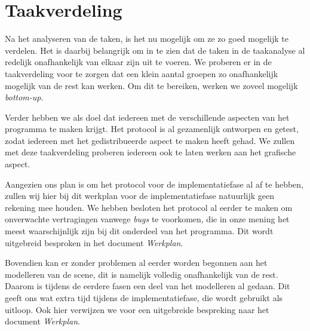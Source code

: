 \documentclass[a4paper,11pt]{article}
\begin{document}
    \section{Taakverdeling}
    Na het analyseren van de taken, is het nu mogelijk om ze zo goed mogelijk te verdelen. Het is daarbij belangrijk om in te zien dat de taken in de taakanalyse al redelijk onafhankelijk van elkaar zijn uit te voeren. We proberen er in de taakverdeling voor te zorgen dat een klein aantal groepen zo onafhankelijk mogelijk van de rest kan werken. Om dit te bereiken, werken we zoveel mogelijk \emph{bottom-up}. 
    
    Verder hebben we als doel dat iedereen met de verschillende aspecten van het programma te maken krijgt. Het protocol is al gezamenlijk ontworpen en getest, zodat iedereen met het gedistribueerde aspect te maken heeft gehad. We zullen met deze taakverdeling proberen iedereen ook te laten werken aan het grafische aspect.
    
    Aangezien ons plan is om het protocol voor de implementatiefase al af te hebben, zullen wij hier bij dit werkplan voor de implementatiefase natuurlijk geen rekening mee houden. We hebben besloten het protocol al eerder te maken om onverwachte vertragingen vanwege \emph{bugs} te voorkomen, die in onze mening het meest waarschijnlijk zijn bij dit onderdeel van het programma. Dit wordt uitgebreid besproken in het document \emph{Werkplan}.
    
    Bovendien kan er zonder problemen al eerder worden begonnen aan het modelleren van de scene, dit is namelijk volledig onafhankelijk van de rest. Daarom is tijdens de eerdere fasen een deel van het modelleren al gedaan. Dit geeft ons wat extra tijd tijdens de implementatiefase, die wordt gebruikt als uitloop. Ook hier verwijzen we voor een uitgebreide bespreking naar het document \emph{Werkplan}.
    
\end{document}
